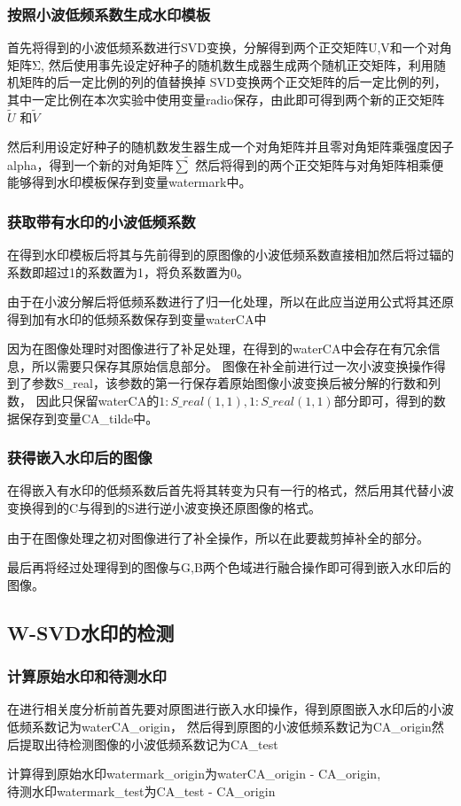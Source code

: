 \documentclass[a4paper,11pt,UTF8]{ctexart}
\begin{document}
    \subsubsection{按照小波低频系数生成水印模板}
      首先将得到的小波低频系数进行SVD变换，分解得到两个正交矩阵U,V和一个对角矩阵Σ,
      然后使用事先设定好种子的随机数生成器生成两个随机正交矩阵，利用随机矩阵的后一定比例的列的值替换掉
      SVD变换两个正交矩阵的后一定比例的列，其中一定比例在本次实验中使用变量radio保存，由此即可得到两个新的正交矩阵
      $\widetilde{U}$ 和$\widetilde{V}$\par
      然后利用设定好种子的随机数发生器生成一个对角矩阵并且零对角矩阵乘强度因子alpha，得到一个新的对角矩阵$\widetilde{ \sum}$
      然后将得到的两个正交矩阵与对角矩阵相乘便能够得到水印模板保存到变量watermark中。
    \subsubsection{获取带有水印的小波低频系数}
      在得到水印模板后将其与先前得到的原图像的小波低频系数直接相加然后将过辐的系数即超过1的系数置为1，将负系数置为0。\par
      由于在小波分解后将低频系数进行了归一化处理，所以在此应当逆用公式将其还原得到加有水印的低频系数保存到变量waterCA中\par
      因为在图像处理时对图像进行了补足处理，在得到的waterCA中会存在有冗余信息，所以需要只保存其原始信息部分。
      图像在补全前进行过一次小波变换操作得到了参数S\_real，该参数的第一行保存着原始图像小波变换后被分解的行数和列数，
      因此只保留waterCA的$1:S\_real(1,1),1:S\_real(1,1)$部分即可，得到的数据保存到变量CA\_tilde中。
    \subsubsection{获得嵌入水印后的图像}
      在得嵌入有水印的低频系数后首先将其转变为只有一行的格式，然后用其代替小波变换得到的C与得到的S进行逆小波变换还原图像的格式。\par
      由于在图像处理之初对图像进行了补全操作，所以在此要裁剪掉补全的部分。\par
      最后再将经过处理得到的图像与G,B两个色域进行融合操作即可得到嵌入水印后的图像。

  \subsection{W-SVD水印的检测}
    \subsubsection{计算原始水印和待测水印}
      在进行相关度分析前首先要对原图进行嵌入水印操作，得到原图嵌入水印后的小波低频系数记为waterCA\_origin，
      然后得到原图的小波低频系数记为CA\_origin然后提取出待检测图像的小波低频系数记为CA\_test\par
      计算得到原始水印watermark\_origin为waterCA\_origin - CA\_origin,\\
      待测水印watermark\_test为CA\_test - CA\_origin
\end{document}
